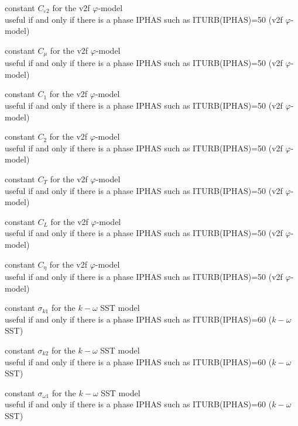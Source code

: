 {constant $C_{\varepsilon 2}$ for the v2f $\varphi$-model\\
useful if and only if there is a phase IPHAS such as ITURB(IPHAS)=50
(v2f $\varphi$-model)}

{constant $C_\mu$ for the v2f $\varphi$-model\\
useful if and only if there is a phase IPHAS such as ITURB(IPHAS)=50
(v2f $\varphi$-model)}

{constant $C_1$ for the v2f $\varphi$-model\\
useful if and only if there is a phase IPHAS such as ITURB(IPHAS)=50
(v2f $\varphi$-model)}

{constant $C_2$ for the v2f $\varphi$-model\\
useful if and only if there is a phase IPHAS such as ITURB(IPHAS)=50
(v2f $\varphi$-model)}

{constant $C_T$ for the v2f $\varphi$-model\\
useful if and only if there is a phase IPHAS such as ITURB(IPHAS)=50
(v2f $\varphi$-model)}

{constant $C_L$ for the v2f $\varphi$-model\\
useful if and only if there is a phase IPHAS such as ITURB(IPHAS)=50
(v2f $\varphi$-model)}

{constant $C_\eta$ for the v2f $\varphi$-model\\
useful if and only if there is a phase IPHAS such as ITURB(IPHAS)=50
(v2f $\varphi$-model)}


{constant $\sigma_{k1}$ for the $k-\omega$ SST model\\
useful if and only if there is a phase IPHAS such as ITURB(IPHAS)=60
($k-\omega$ SST)}

{constant $\sigma_{k2}$ for the $k-\omega$ SST model\\
useful if and only if there is a phase IPHAS such as ITURB(IPHAS)=60
($k-\omega$ SST)}

{constant $\sigma_{\omega 1}$ for the $k-\omega$ SST model\\
useful if and only if there is a phase IPHAS such as ITURB(IPHAS)=60
($k-\omega$ SST)}

